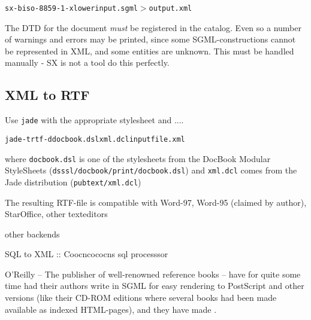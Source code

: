 \begin{alltt}
  sx -biso-8859-1 -xlower input.sgml $>$ output.xml
\end{alltt}

The DTD for the document \textit{must} be registered in the
\textsf{catalog}.  Even so a number of warnings and errors may be
printed, since some SGML-constructions cannot be represented in XML,
and some entities are unknown.  This must be handled manually - SX is
not a tool do this perfectly.


\subsection{XML to RTF}
\label{sec:docbook-xml-to-rtf}

Use \texttt{jade} with the appropriate stylesheet and \textsf{....}

\begin{alltt}
         jade -t rtf -d docbook.dsl xml.dcl inputfile.xml
\end{alltt}

where \texttt{docbook.dsl} is one of the stylesheets from the
\textsf{DocBook Modular StyleSheets}
(\texttt{dsssl/docbook/print/docbook.dsl}) and \texttt{xml.dcl} comes
from the Jade distribution (\texttt{pubtext/xml.dcl})

The resulting RTF-file is compatible with Word-97, Word-95 (claimed by
author), StarOffice, \textsf{other texteditors} 

\textsf{other backends}

SQL to XML :: Coocncococns sql processsor


O'Reilly -- The publisher of well-renowned reference books -- have for
quite some time had their authors write in SGML for easy rendering to
PostScript and other versions (like their CD-ROM editions where
several books had been made available as indexed HTML-pages), and they
have made
.


